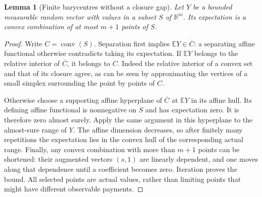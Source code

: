 \documentclass[11pt,a4paper]{article}
\newtheorem{lemma}[theorem]{Lemma}
\begin{document}
\begin{lemma}[Finite barycentres without a closure gap]
\label{lem:barycentre}
Let $Y$ be a bounded measurable random vector with values in a subset
$S$ of $\mathbb R^m$. Its expectation is a convex combination of at
most $m+1$ points of $S$.
\end{lemma}
\begin{proof}
Write $C=\operatorname{conv}(S)$. Separation first implies
$\mathbb EY\in\overline C$: a separating affine functional otherwise
contradicts taking its expectation. If $\mathbb EY$ belongs to the
relative interior of $\overline C$, it belongs to $C$. Indeed the
relative interior of a convex set and that of its closure agree, as
can be seen by approximating the vertices of a small simplex surrounding
the point by points of $C$.

Otherwise choose a supporting affine hyperplane of $\overline C$ at
$\mathbb EY$ in its affine hull. Its defining affine functional is
nonnegative on $S$ and has expectation zero. It is therefore zero
almost surely. Apply the same argument in this hyperplane to the
almost-sure range of $Y$. The affine dimension decreases, so after
finitely many repetitions the expectation lies in the convex hull of
the corresponding actual range. Finally, any convex combination with
more than $m+1$ points can be shortened: their augmented vectors
$(s,1)$ are linearly dependent, and one moves along that dependence
until a coefficient becomes zero. Iteration proves the bound.
All selected points are actual values, rather than limiting points
that might have different observable payments.
\end{proof}
\end{document}
